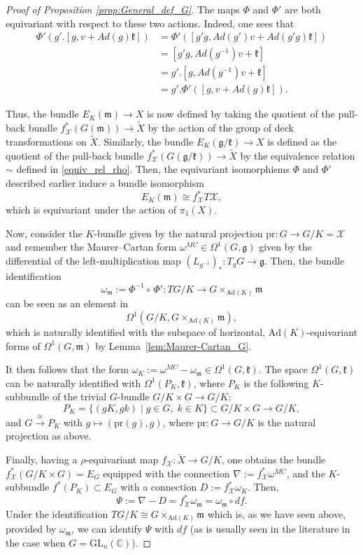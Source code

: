 \documentclass[oneside,11pt]{amsart}
\theoremstyle{definition}
\theoremstyle{remark}
\numberwithin{thm}{section}
\numberwithin{equation}{section}
\begin{document}
\begin{proof}[Proof of Proposition \ref{prop:General_def_G}]
\noindent The maps $\Phi$ and $\Phi'$ are both equivariant with respect to these two actions. Indeed, one sees that
\begin{align*}
\Phi'(g'.[g,v+Ad(g)\mathfrak k]) & = \Phi'([g'g,Ad(g')v+Ad(g'g)\mathfrak k])\\
 & = [g'g,Ad(g^{-1})v+\mathfrak k]\\
 & = g'.[g,Ad(g^{-1})v+\mathfrak k]\\
 & = g'.\Phi'([g,v+Ad(g)\mathfrak k]).
 \end{align*}

\noindent Thus, the bundle $E_K(\mathfrak m)\to X$  is now defined by taking the quotient of the pull-back bundle $f^*_\mathcal X(G(\mathfrak m))\to \tilde X$ by the action of the group of deck transformations on $\tilde X$. Similarly, the bundle $E_K(\mathfrak{g}/\mathfrak{k})\to X$ is defined as the quotient of the pull-back bundle $f^*_\mathcal X(G(\mathfrak{g}/\mathfrak{k}))\to \tilde X$ by the equivalence relation $\sim$ defined in \eqref{equiv_rel_rho}. Then, the equivariant isomorphisms $\Phi$ and $\Phi'$ described earlier induce a bundle isomorphism
\[E_K(\mathfrak m) \cong f^{*}_{\mathcal{X}} T\mathcal{X}, \]
which is equivariant under the action of $\pi_1(X)$.

\noindent Now, consider the $K$-bundle given by the natural projection $\mathrm{pr}\colon G\to G/K=\mathcal X$ and remember the Maurer--Cartan form $\omega^{MC}\in\Omega^1(G,\mathfrak g)$ given by the differential of the left-multiplication map $(L_{g^{-1}})_*\colon T_gG\to \mathfrak g$. Then, the bundle identification 
\[\omega_\mathfrak m:=\Phi^{-1}\circ\,\Phi'\colon TG/K\to G\times_{\mathrm{Ad}(K)}\mathfrak m\] can be seen as an element in
\[\Omega^1(G/K,G\times_{\mathrm{Ad}(K)}\mathfrak m),\]
which is naturally identified with the subspace of horizontal, $\mathrm{Ad}(K)$-equivariant forms of $\Omega^1(G,\mathfrak m)$ by Lemma~\ref{lem:Maurer-Cartan_G}. 


\noindent  It then follows that the form $\omega_K:=\omega^{MC}-\omega_\mathfrak m\in\Omega^1(G,\mathfrak k)$. The space $\Omega^1(G,\mathfrak k)$ can be naturally identified with $\Omega^1(P_K,\mathfrak k)$, where $P_K$ is the following $K$-subbundle of the trivial $G$-bundle $G/K\times G\to G/K$:
\[P_K=\{(gK,gk)\mid g\in G,\;k\in K\}\subset G/K\times G\to G/K,\] 
and $G\overset{\cong}{\longrightarrow} P_K$ with $g\mapsto (\mathrm{pr}(g),g)$, where $\mathrm{pr}\colon G\to G/K$ is the natural projection as above.

\noindent  Finally, having a $\rho$-equivariant map $f_\mathcal X\colon \tilde X\to G/K$, one obtains the bundle $f_\mathcal X^*(G/K\times G)=E_G$ equipped with the connection $\nabla:=f_\mathcal X^*\omega^{MC}$, and the $K$-subbundle $f^*(P_K)\subset E_G$ with a connection $D:=f_\mathcal X^*\omega_K$. Then, 
\[\Psi:=\nabla-D=f_\mathcal X^*\omega_\mathfrak m=\omega_\mathfrak m\circ df.\] Under the identification $TG/K\cong G\times_{\mathrm{Ad}(K)}\mathfrak m$ which is, as we have seen above, provided by $\omega_\mathfrak m$, we can identify $\Psi$ with $df$ (as is usually seen in the literature in the case when $G=\mathrm{GL}_n(\mathbb{C})$).
\end{proof}
\end{document}
